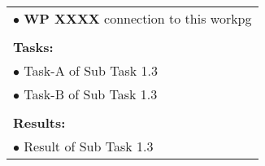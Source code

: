 \begin{table}[!h]
\begin{center}
\begin{tabular}{|p{}||p{}|p{}||p{}|}
            \multicolumn{4}{|p{.95\columnwidth}|}{$\bullet$ \textbf{WP XXXX} connection to this workpg}\\
            \multicolumn{4}{|p{.95\columnwidth}|}{}\\
            \multicolumn{4}{|p{.95\columnwidth}|}{\textbf{Tasks:}}\\
            \multicolumn{4}{|p{.95\columnwidth}|}{$\bullet$ Task-A of Sub Task 1.3}\\
            \multicolumn{4}{|p{.95\columnwidth}|}{$\bullet$ Task-B of Sub Task 1.3}\\
            \multicolumn{4}{|p{.95\columnwidth}|}{}\\
            \multicolumn{4}{|p{.95\columnwidth}|}{\textbf{Results:}}\\
            \multicolumn{4}{|p{.95\columnwidth}|}{$\bullet$ Result of Sub Task 1.3}\\
            \hline
        \end{tabular}
    \end{center}
\end{table}

\clearpage


